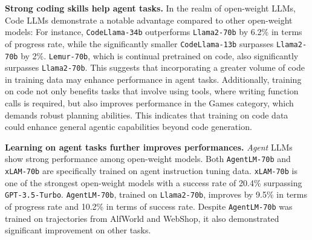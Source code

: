 

\textbf{Strong coding skills help agent tasks.}
In the realm of open-weight LLMs, Code LLMs demonstrate a notable advantage compared to other open-weight models: For instance, \texttt{CodeLlama-34b} outperforms \texttt{Llama2-70b} by 6.2\% in terms of progress rate, while the significantly smaller \texttt{CodeLlama-13b} surpasses \texttt{Llama2-70b} by 2\%. \texttt{Lemur-70b}, which is continual pretrained on code, also significantly surpasses \texttt{Llama2-70b}. This suggests that incorporating a greater volume of code in training data may enhance performance in agent tasks. Additionally, training on code not only benefits tasks that involve using tools, where writing function calls is required, but also improves performance in the Games category, which demands robust planning abilities. This indicates that training on code data could enhance general agentic capabilities beyond code generation.


\textbf{Learning on agent tasks further improves performances.} \textit{Agent} LLMs show strong performance among open-weight models. Both \texttt{AgentLM-70b} and \texttt{xLAM-70b} are specifically trained on agent instruction tuning data.  \texttt{xLAM-70b} is one of the strongest open-weight models with a success rate of 20.4\% surpassing \texttt{GPT-3.5-Turbo}. \texttt{AgentLM-70b}, trained on \texttt{Llama2-70b}, improves by 9.5\% in terms of progress rate and 10.2\% in terms of success rate. Despite \texttt{AgentLM-70b} was trained on trajectories from AlfWorld and WebShop, it also demonstrated significant improvement on other tasks. 



